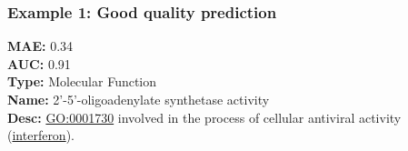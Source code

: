 \documentclass[aspectratio=169, 9pt]{beamer}
\begin{document}
\begin{frame}[t]
	\frametitle{Example 1: Good quality prediction}
	
\begin{minipage}[m]{.3\linewidth}
	\textbf{MAE:} 0.34 \\
	\textbf{AUC:} 0.91 \\
	\textbf{Type:} Molecular Function\\
	\textbf{Name:} 2'-5'-oligoadenylate synthetase activity\\
	\textbf{Desc:}  \href{http://amigo.geneontology.org/amigo/term/GO:0001730}{\alert{GO:0001730}} involved in the process of cellular antiviral activity (\href{https://en.wikipedia.org/wiki/Interferon}{\alert{interferon}}).
\end{minipage}
\begin{minipage}[m]{.65\linewidth}
	\def\tmpwdth{.9\linewidth}
\end{minipage}
\end{frame}
\end{document}
